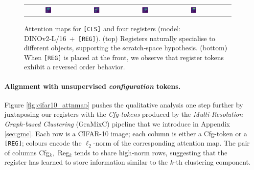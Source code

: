 \documentclass{article}
\newcommand{\RegTok}{\texttt{[REG]}\xspace}
\begin{document}
\begin{figure}[t]
\begin{tabular}{cccccc}
    \includegraphics[width=0.13\textwidth]{resources/230913_fig_slot_attn/mug_attn_reg_0_-.png} &
    \includegraphics[width=0.13\textwidth]{resources/230913_fig_slot_attn/mug_attn_reg_6_-.png} &
    \includegraphics[width=0.13\textwidth]{resources/230913_fig_slot_attn/mug_attn_reg_8_-.png} &
    \includegraphics[width=0.13\textwidth]{resources/230913_fig_slot_attn/mug_attn_reg_12_-.png}
    \\
  \end{tabular}
  \caption{
    Attention maps for \texttt{[CLS]} and four registers (model: DINOv2‑L/16 + \RegTok).  
    (top) Registers naturally specialise to different objects, supporting the scratch‑space hypothesis.
    (bottom) When \RegTok is placed at the front, we observe that register tokens exhibit a reversed order behavior.
  }
  \label{fig:slot_attn}
\end{figure}
\paragraph{Alignment with unsupervised \emph{configuration} tokens.}
Figure \cref{fig:cifar10_attnmap} pushes the qualitative analysis one step further by juxtaposing our registers with the \emph{Cfg-tokens} produced by the \emph{Multi-Resolution Graph-based Clustering} (GraMixC) pipeline that we introduce in Appendix \ref{sec:gmc}.
Each row is a CIFAR-10 image; each column is either a Cfg-token or a \RegTok; colours encode the $\ell_2$-norm of the corresponding attention map.
The pair of columns {Cfg$_k$, Reg$_k$} tends to share high‑norm rows, suggesting that the register has learned to store information similar to the $k$‑th clustering component.
\end{document}
